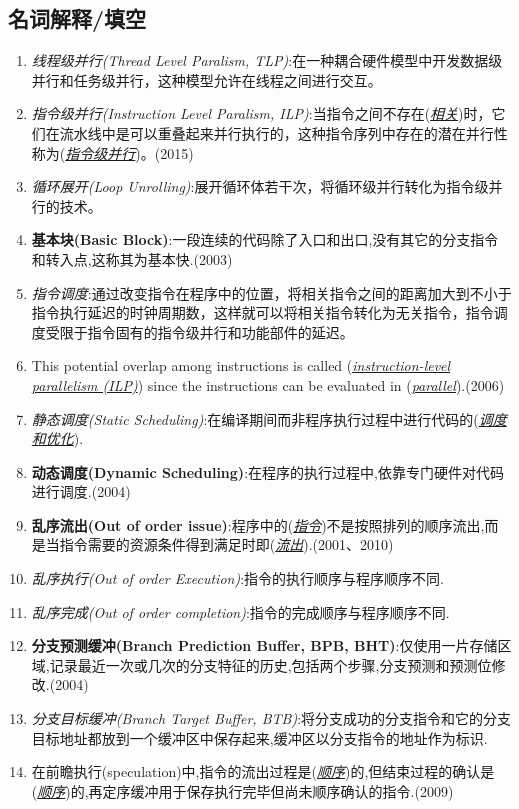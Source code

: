 \documentclass[a4paper]{ctexart}
\newcommand{\blank}[1]{(\emph{\underline{#1}})}
\begin{document}
\subsection{名词解释/填空}
\begin{enumerate}
  \item \emph{线程级并行(Thread Level Paralism, TLP)}:在一种耦合硬件模型中开发数据级并行和任务级并行，这种模型允许在线程之间进行交互。
  \item \emph{指令级并行(Instruction Level Paralism, ILP)}:当指令之间不存在\blank{相关}时，它们在流水线中是可以重叠起来并行执行的，这种指令序列中存在的潜在并行性称为\blank{指令级并行}。(2015)
  \item \emph{循环展开(Loop Unrolling)}:展开循环体若干次，将循环级并行转化为指令级并行的技术。
  \item \textbf{基本块(Basic Block)}:一段连续的代码除了入口和出口,没有其它的分支指令和转入点,这称其为基本快.(2003)
  \item \emph{指令调度}:通过改变指令在程序中的位置，将相关指令之间的距离加大到不小于指令执行延迟的时钟周期数，这样就可以将相关指令转化为无关指令，指令调度受限于指令固有的指令级并行和功能部件的延迟。
  \item This potential overlap among instructions is called (\emph{\underline{instruction-level parallelism (ILP)}}) since the instructions can be evaluated in (\emph{\underline{parallel}}).(2006)
  \item \emph{静态调度(Static Scheduling)}:在编译期间而非程序执行过程中进行代码的\blank{调度和优化}.
  \item \textbf{动态调度(Dynamic Scheduling)}:在程序的执行过程中,依靠专门硬件对代码进行调度.(2004)
  \item \textbf{乱序流出(Out of order issue)}:程序中的\blank{指令}不是按照排列的顺序流出,而是当指令需要的资源条件得到满足时即\blank{流出}.(2001、2010)
  \item \emph{乱序执行(Out of order Execution)}:指令的执行顺序与程序顺序不同.
  \item \emph{乱序完成(Out of order completion)}:指令的完成顺序与程序顺序不同.
  \item \textbf{分支预测缓冲(Branch Prediction Buffer, BPB, BHT)}:仅使用一片存储区域,记录最近一次或几次的分支特征的历史,包括两个步骤,分支预测和预测位修改.(2004)
  \item \emph{分支目标缓冲(Branch Target Buffer, BTB)}:将分支成功的分支指令和它的分支目标地址都放到一个缓冲区中保存起来,缓冲区以分支指令的地址作为标识.
  \item 在前瞻执行(speculation)中,指令的流出过程是\blank{顺序}的,但结束过程的确认是\blank{顺序}的,再定序缓冲用于保存执行完毕但尚未顺序确认的指令.(2009)

\end{enumerate}
\end{document}
